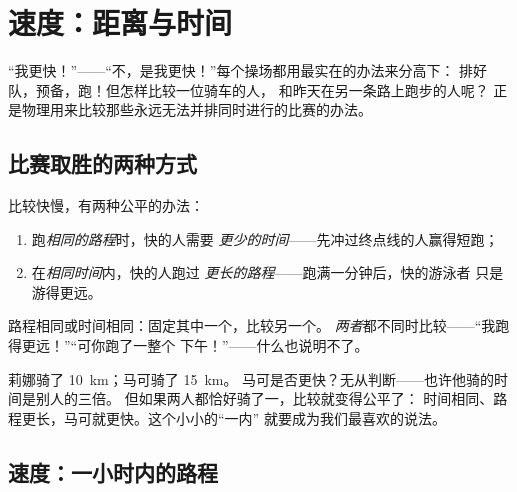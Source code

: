 \chapter{速度：距离与时间}\label{ch:g5:speed-distance-time}

“我更快！”——“不，是我更快！”每个操场都用最实在的办法来分高下：
排好队，预备，跑！但怎样比较一位骑车的人，
和昨天在另一条路上跑步的人呢？
正是物理用来比较那些永远无法并排同时进行的比赛的办法。

\section{比赛取胜的两种方式}

\begin{proposition}[公平比赛的规则]\label{prop:g5:speed-distance-time:rules}
比较快慢，有两种公平的办法：
\begin{enumerate}
  \item 跑\emph{相同的路程}时，快的人需要
        \emph{更少的时间}——先冲过终点线的人赢得短跑；
  \item 在\emph{相同时间}内，快的人跑过
        \emph{更长的路程}——跑满一分钟后，快的游泳者
        只是游得更远。
\end{enumerate}
路程相同或时间相同：固定其中一个，比较另一个。
\emph{两者}都不同时比较——“我跑得更远！”“可你跑了一整个
下午！”——什么也说明不了。
\end{proposition}

\begin{example}[不公平与公平]\label{ex:g5:speed-distance-time:fair}
莉娜骑了 \qty{10}{km}；马可骑了 \qty{15}{km}。
马可是否更快？无从判断——也许他骑的时间是别人的三倍。
但如果两人都恰好骑了一，比较就变得公平了：
时间相同、路程更长，马可就更快。这个小小的“一内”
就要成为我们最喜欢的说法。
\end{example}

\section{速度：一小时内的路程}

